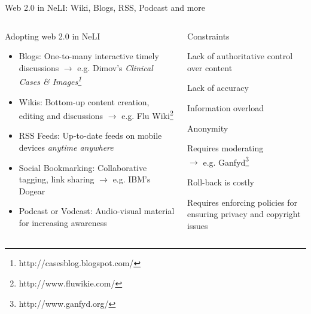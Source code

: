 \documentclass{beamer}
\begin{document}
\begin{frame}[t]{Web 2.0 in NeLI: Wiki, Blogs, RSS, Podcast and more}
\begin{columns}
\begin{block}{Adopting web 2.0 in NeLI}
\begin{itemize}
\item \alert{Blogs:} \small One-to-many interactive timely discussions %
$\rightarrow$ \scriptsize e.g. Dimov's \textit{Clinical Cases \& Images\footnote{\scriptsize http://casesblog.blogspot.com/}}
\item \small \alert{Wikis:} Bottom-up content creation, editing and discussions %
$\rightarrow$ \scriptsize e.g. Flu Wiki\footnote{\scriptsize http://www.fluwikie.com/}
\item \small \alert{RSS Feeds:} Up-to-date feeds on mobile devices \textit{anytime anywhere}
\item \small \alert{Social Bookmarking:} Collaborative tagging, link sharing %
$\rightarrow$ \scriptsize e.g. IBM's Dogear%
\item \small \alert{Podcast or Vodcast:} Audio-visual material for increasing awareness
\end{itemize}
\end{block}
%
\begin{block}{Constraints}
\begin{itemize}
\begin{small}
\item  Lack of \alert{authoritative control} over content \item  Lack of \alert{accuracy} 
\item  Information \alert{overload}
\item  \alert{Anonymity} %
\item Requires \alert{moderating}\\ 
$\rightarrow$  \scriptsize e.g. Ganfyd\footnote{\scriptsize  http://www.ganfyd.org/}
\item  \small \alert{Roll-back} is costly\\
\item  Requires enforcing policies for ensuring \alert{privacy and copyright} issues
\end{small}
\end{itemize}
\end{block}
\end{columns}  	
\end{frame}
\end{document}
